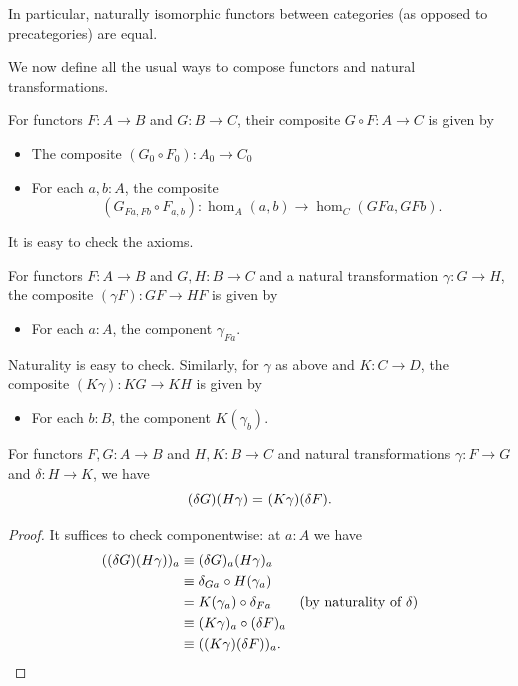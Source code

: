 In particular, naturally isomorphic functors between categories (as opposed to precategories) are equal.

\mentalpause

We now define all the usual ways to compose functors and natural transformations.

\begin{defn}\label{ct:functor-composition}
  For functors $F:A\to B$ and $G:B\to C$, their composite $G\circ F:A\to C$ is given by
  \begin{itemize}
  \item The composite $(G_0\circ F_0) : A_0 \to C_0$
  \item For each $a,b:A$, the composite
    \[(G_{Fa,Fb}\circ F_{a,b}):\hom_A(a,b) \to \hom_C(GFa,GFb).\]
  \end{itemize}
  It is easy to check the axioms.
\end{defn}

\begin{defn}\label{ct:whisker}
  For functors $F:A\to B$ and $G,H:B\to C$ and a natural transformation $\gamma:G\to H$, the composite $(\gamma F):GF\to HF$ is given by
  \begin{itemize}
  \item For each $a:A$, the component $\gamma_{Fa}$.
  \end{itemize}
  Naturality is easy to check.
  Similarly, for $\gamma$ as above and $K:C\to D$, the composite $(K\gamma):KG\to KH$ is given by
  \begin{itemize}
  \item For each $b:B$, the component $K(\gamma_b)$.
  \end{itemize}
\end{defn}

\begin{lem}\label{ct:interchange}
  For functors $F,G:A\to B$ and $H,K:B\to C$ and natural transformations $\gamma:F\to G$ and $\delta:H\to K$, we have
  \[(\delta G)(H\gamma) =_{} (K\gamma)(\delta F).\]
\end{lem}
\begin{proof}
  It suffices to check componentwise: at $a:A$ we have
  \begin{align*}
    ((\delta G)(H\gamma))_a
    &\equiv (\delta G)_{a}(H\gamma)_a\\
    &\equiv \delta_{Ga}\circ H(\gamma_a)\\
    &= K(\gamma_a) \circ \delta_{Fa} \tag{by naturality of $\delta$}\\
    &\equiv (K \gamma)_a\circ (\delta F)_a\\
    &\equiv ((K \gamma)(\delta F))_a.\qedhere
  \end{align*}
\end{proof}

